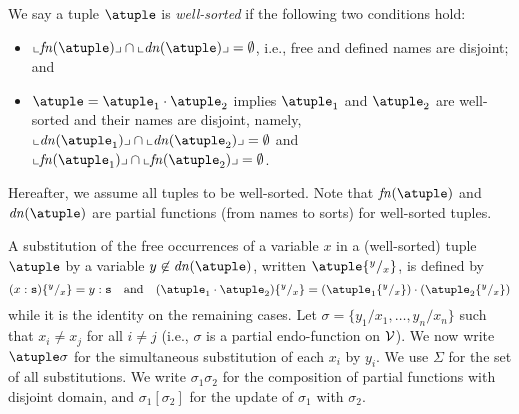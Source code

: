 \smallskip
We say a tuple $\atuple$ is {\em well-sorted} if the following two
conditions hold:
\begin{itemize}
\item
  $\supp{\fn\atuple} \cap \supp{\dn{\atuple}} = \emptyset$, i.e., free and
  defined names are disjoint; and
\item
  $\atuple = \atuple_1 \cdot \atuple_2$ implies $\atuple_1$ and
  $\atuple_2$ are well-sorted and their names are disjoint, namely, 
  $\supp{\dn{\atuple_1}} \cap \supp{\dn{\atuple_2}} =  \emptyset$
  and 
  $\supp{\fn{\atuple_1}} \cap \supp{\fn{\atuple_2}} =  \emptyset$.
\end{itemize}
%
Hereafter, we assume all tuples to be well-sorted.
%
Note that $\fn{\atuple}$ and $\dn{\atuple}$ are partial functions (from names to sorts)
for well-sorted tuples.

\smallskip
A substitution of the free occurrences of a variable $x$ in a
(well-sorted) tuple $\atuple$ 
by a variable $y\not\in \dn{\atuple}$, written $\atuple \sust x y$, is
defined by
%
\[
(x  : \asort) \sust x y  = y : \asort
\quad\text{and}\quad
(\atuple_1 \cdot \atuple_2) \sust x y  = 
(\atuple_1\sust x y) \cdot (\atuple_2\sust x y) 
\]
%
while it is the identity on the remaining cases. Let
$\sigma = \{y_1/x_1,\ldots,y_n/x_n\}$ such that $x_i\neq x_j$ for all
$i\neq j$ (i.e., $\sigma$ is a partial endo-function on $\mathcal{V}$).
We now write
$\atuple\sigma$ for the simultaneous substitution of each $x_i$ by
$y_i$.
%
We use $\Sigma$ for the set of all substitutions. We write
$\sigma_1\sigma_2$ for the composition of partial functions with
disjoint domain, and $\sigma_1[\sigma_2]$ for the update of $\sigma_1$
with $\sigma_2$.

